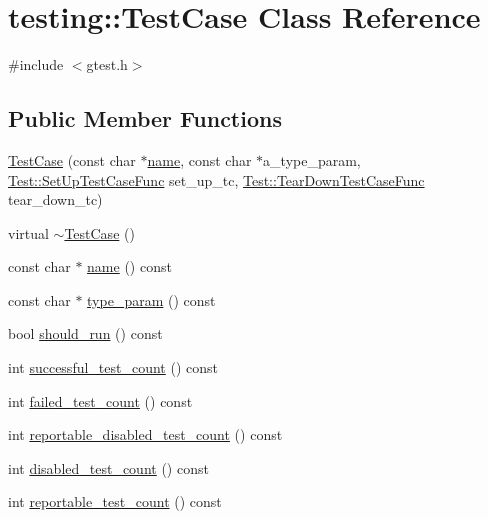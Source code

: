 \hypertarget{classtesting_1_1TestCase}{}\section{testing\+:\+:Test\+Case Class Reference}
\label{classtesting_1_1TestCase}


{\ttfamily \#include $<$gtest.\+h$>$}

\subsection*{Public Member Functions}
\begin{DoxyCompactItemize}
\item 
\hyperlink{classtesting_1_1TestCase_a8a43b04703bfc7d56597fcb9b76ffbf5}{Test\+Case} (const char $\ast$\hyperlink{classtesting_1_1TestCase_af4dfd4ece8e66520a30e6a9fbd9d43aa}{name}, const char $\ast$a\+\_\+type\+\_\+param, \hyperlink{classtesting_1_1Test_a5f2a051d1d99c9b784c666c586186cf9}{Test\+::\+Set\+Up\+Test\+Case\+Func} set\+\_\+up\+\_\+tc, \hyperlink{classtesting_1_1Test_aa0f532e93b9f3500144c53f31466976c}{Test\+::\+Tear\+Down\+Test\+Case\+Func} tear\+\_\+down\+\_\+tc)
\item 
virtual \hyperlink{classtesting_1_1TestCase_a96ab68dd1f8f64a7087ac34ff64a2e46}{$\sim$\+Test\+Case} ()
\item 
const char $\ast$ \hyperlink{classtesting_1_1TestCase_af4dfd4ece8e66520a30e6a9fbd9d43aa}{name} () const 
\item 
const char $\ast$ \hyperlink{classtesting_1_1TestCase_a2052c095bc6ac9c0ab1cae6f0e2d9fc9}{type\+\_\+param} () const 
\item 
bool \hyperlink{classtesting_1_1TestCase_a0e49de754452943d88e3083e6cdded00}{should\+\_\+run} () const 
\item 
int \hyperlink{classtesting_1_1TestCase_a8fb3974ccb5242ad9d1d633d53c0f730}{successful\+\_\+test\+\_\+count} () const 
\item 
int \hyperlink{classtesting_1_1TestCase_ae74e7a2e75d07f9feca2c3384604cb01}{failed\+\_\+test\+\_\+count} () const 
\item 
int \hyperlink{classtesting_1_1TestCase_a4ec19c0058282562c0cc2c0e87d4b211}{reportable\+\_\+disabled\+\_\+test\+\_\+count} () const 
\item 
int \hyperlink{classtesting_1_1TestCase_ac1e3cd2b598f19ce10e42b3421508a9e}{disabled\+\_\+test\+\_\+count} () const 
\item 
int \hyperlink{classtesting_1_1TestCase_a7693150fa71d460a19b291ed6f5c18bd}{reportable\+\_\+test\+\_\+count} () const 

\end{DoxyCompactItemize}
